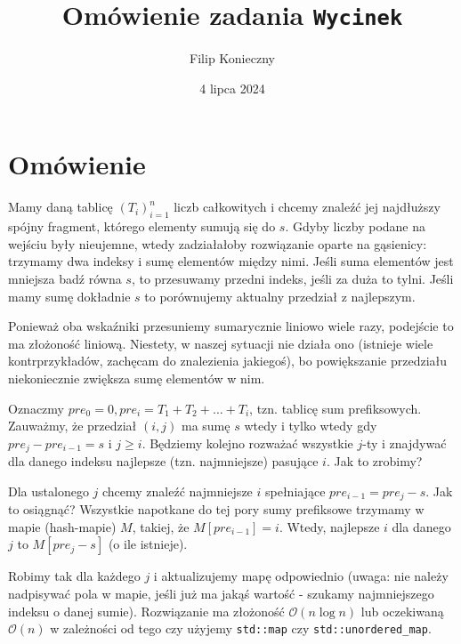 \documentclass[]{article}
\author{Filip Konieczny}
\date{4 lipca 2024}
\title{Omówienie zadania \texttt{Wycinek}}
\newcommand{\Oh}[1]{\mathcal{O}{\left(#1\right)}}
\begin{document}
\maketitle
\section{Omówienie}

Mamy daną tablicę $(T_i)_{i=1}^n$ liczb całkowitych i chcemy znaleźć jej najdłuższy spójny fragment, którego elementy sumują się do $s$. Gdyby liczby podane na wejściu były nieujemne, wtedy zadziałałoby rozwiązanie oparte na gąsienicy: trzymamy dwa indeksy i sumę elementów między nimi. Jeśli suma elementów jest mniejsza badź równa $s$, to przesuwamy przedni indeks, jeśli za duża to tylni. Jeśli mamy sumę dokładnie $s$ to porównujemy aktualny przedział z najlepszym.

Ponieważ oba wskaźniki przesuniemy sumarycznie liniowo wiele razy, podejście to ma złożoność liniową. Niestety, w naszej sytuacji nie działa ono (istnieje wiele kontrprzykładów, zachęcam do znalezienia jakiegoś), bo powiększanie przedziału niekoniecznie zwiększa sumę elementów w nim.

Oznaczmy $pre_0 = 0, pre_i = T_1 + T_2 +\ldots + T_i$, tzn. tablicę sum prefiksowych. Zauważmy, że przedział $(i,j)$ ma sumę $s$ wtedy i tylko wtedy gdy $pre_j - pre_{i-1} = s$ i $j \geq i$. Będziemy kolejno rozważać wszystkie $j$-ty i znajdywać dla danego indeksu najlepsze (tzn. najmniejsze) pasujące $i$. Jak to zrobimy? 

Dla ustalonego $j$ chcemy znaleźć najmniejsze $i$ spełniające $pre_{i-1} = pre_j - s$. Jak to osiągnąć? Wszystkie napotkane do tej pory sumy prefiksowe trzymamy w mapie (hash-mapie) $M$, takiej, że $M[pre_{i-1}] = i$. Wtedy, najlepsze $i$ dla danego $j$ to $M[pre_j - s]$ (o ile istnieje).

Robimy tak dla każdego $j$ i aktualizujemy mapę odpowiednio (uwaga: nie należy nadpisywać pola w mapie, jeśli już ma jakąś wartość - szukamy najmniejszego indeksu o danej sumie). Rozwiązanie ma złożoność $\Oh{n\log{n}}$ lub oczekiwaną $\Oh{n}$ w zależności od tego czy użyjemy \texttt{std::map} czy \texttt{std::unordered\_map}.
\end{document}
